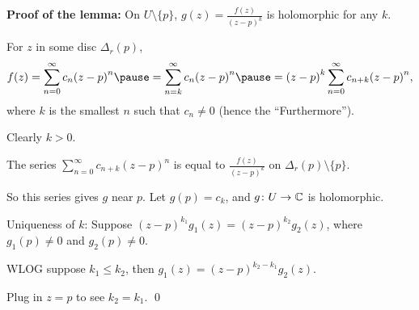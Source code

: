 \documentclass[10pt,aspectratio=169]{beamer}
\begin{document}
\begin{frame}
\textbf{Proof of the lemma:}
On $U \setminus \{ p \}$, $g(z) = \frac{f(z)}{{(z-p)}^k}$ is
holomorphic for any $k$.

\medskip
\pause

For $z$ in some disc $\Delta_r(p)$,
\[
f(z)
=
\sum_{n=0}^\infty c_n {(z-p)}^n
\pause
=
\sum_{n=k}^\infty c_n {(z-p)}^n 
\pause
= {(z-p)}^k
\sum_{n=0}^\infty c_{n+k} {(z-p)}^{n} ,
\]
\pause
where $k$ is the smallest $n$ such that $c_n \not= 0$ (hence the ``Furthermore'').

\medskip
\pause

Clearly $k > 0$.

\medskip
\pause

The series $\sum_{n=0}^\infty c_{n+k}{(z-p)}^n$
is equal to $\frac{f(z)}{{(z-p)}^k}$ on
$\Delta_r(p)\setminus \{ p \}$.

\medskip
\pause

So this series gives $g$ near $p$.  Let $g(p)=c_k$, and $g \colon U \to {\mathbb{C}}$ is 
holomorphic.

\medskip
\pause

Uniqueness of $k$:
\pause
Suppose ${(z-p)}^{k_1} g_1(z) = {(z-p)}^{k_2} g_2(z)$, where
$g_1(p) \not= 0$ and $g_2(p) \not= 0$.

\medskip
\pause

WLOG suppose $k_1 \leq k_2$,
\pause
then $g_1(z) = {(z-p)}^{k_2-k_1} g_2(z)$.

\medskip
\pause

Plug in $z=p$ to see $k_2 = k_1$.
\qed
\end{frame}
\end{document}
